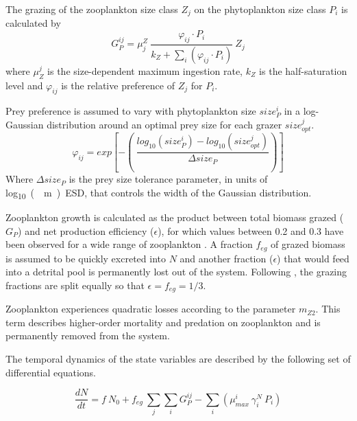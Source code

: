 \documentclass[journal abbreviation, manuscript]{copernicus}
\begin{document}
The grazing of the zooplankton size class $Z_j$ on the phytoplankton size class $P_i$ is calculated by
\begin{equation}
    G_P^{ij} = \mu_j^Z \ \frac{ \varphi_{ij} \cdot P_i }{ k_Z + \sum_{i}(\varphi_{ij} \cdot P_i) } \ Z_j
\end{equation}
where $\mu_Z^j$ is the size-dependent maximum ingestion rate, $k_Z$ is the half-saturation level and $\varphi_{ij}$ is the relative preference of $Z_j$ for $P_i$.

Prey preference is assumed to vary with phytoplankton size $size_{P}^i$ in a log-Gaussian distribution around an optimal prey size for each grazer $size_{opt}^j$.
\begin{equation}
    \varphi_{ij} = exp \left[ -\left( \ \frac{ log_{10}(size_P^i) - log_{10}(size_{opt}^j) }{ \Delta size_{P} } \right) \right]
\end{equation}
Where $\Delta size_{P}$ is the prey size tolerance parameter, in units of \unit{log_{10}(\mu m) ESD}, that controls the width of the Gaussian distribution.

Zooplankton growth is calculated as the product between total biomass grazed ($G_P$) and net production efficiency ($\epsilon$), for which values between 0.2 and 0.3 have been observed for a wide range of zooplankton \citep{Straile1997GrossGroup}. A fraction $f_{eg}$ of grazed biomass is assumed to be quickly excreted into $N$ and another fraction ($\epsilon$) that would feed into a detrital pool is permanently lost out of the system. Following \citet{Banas2011b}, the grazing fractions are split equally  so that $\epsilon = f_{eg} = 1/3$.

Zooplankton experiences quadratic losses according to the parameter $m_{Z2}$. This term describes higher-order mortality and predation on zooplankton and is permanently removed from the system.

The temporal dynamics of the state variables are described by the following set of differential equations.

\begin{equation}
    \frac{d N}{d t} = 
    f \ N_0 %
    +  f_{eg} \ \sum_{j} \sum_{i} G_P^{ij} %
    - \sum_{i} ( \mu_{max}^i \ \gamma_i^N \ P_i) %
\end{equation}
\end{document}
